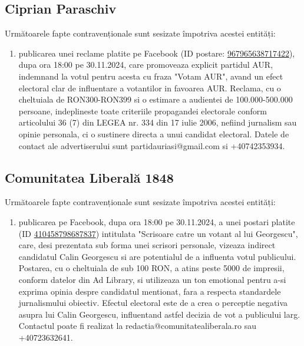 \documentclass[a4paper,12pt]{article}
\begin{document}
\vspace{0.5cm}

\subsection{Ciprian Paraschiv}
Următoarele fapte contravenționale sunt sesizate împotriva acestei entități:

\begin{enumerate}[leftmargin=*, label=\arabic*.)]
    \item publicarea unei reclame platite pe Facebook (ID postare: \href{https://www.facebook.com/ads/library/?id=967965638717422}{967965638717422}), dupa ora 18:00 pe 30.11.2024, care promoveaza explicit partidul AUR, indemnand la votul pentru acesta cu fraza "Votam AUR", avand un efect electoral clar de influentare a votantilor in favoarea AUR. Reclama, cu o cheltuiala de RON300-RON399 si o estimare a audientei de 100.000-500.000 persoane,  indeplineste toate criteriile propagandei electorale conform articolului 36 (7) din LEGEA nr. 334 din 17 iulie 2006,  nefiind jurnalism sau opinie personala, ci o sustinere directa a unui candidat electoral.  Datele de contact ale advertiserului sunt partidauriasi@gmail.com si +40742353934.
\end{enumerate}

\vspace{0.5cm}

\subsection{Comunitatea Liberală 1848}
Următoarele fapte contravenționale sunt sesizate împotriva acestei entități:

\begin{enumerate}[leftmargin=*, label=\arabic*.)]
    \item publicarea pe Facebook, dupa ora 18:00 pe 30.11.2024, a unei postari platite (ID \href{https://www.facebook.com/ads/library/?id=410458798687837}{410458798687837}) intitulata "Scrisoare catre un votant al lui Georgescu", care, desi prezentata sub forma unei scrisori personale, vizeaza indirect candidatul Calin Georgescu si are potentialul de a influenta votul publicului.  Postarea, cu o cheltuiala de sub 100 RON, a atins peste 5000 de impresii, conform datelor din Ad Library, si utilizeaza un ton emotional pentru a-si exprima opinia despre candidatul mentionat, fara a respecta standardele jurnalismului obiectiv.  Efectul electoral este de a crea o perceptie negativa asupra lui Calin Georgescu, influentand astfel decizia de vot a publicului larg.  Contactul poate fi realizat la redactia@comunitatealiberala.ro sau +40723632641.
\end{enumerate}
\end{document}
